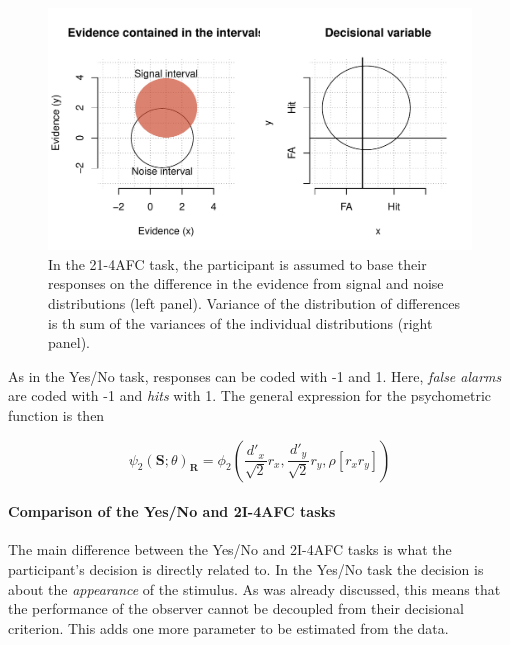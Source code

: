 \documentclass{article}\usepackage{knitr}
\begin{document}
\begin{figure}
\centering
\begin{knitrout}
\color{fgcolor}
\includegraphics[width=\maxwidth]{figure/unnamed-chunk-9-1} 

\end{knitrout}
\caption{In the 21-4AFC task, the participant is assumed to base their responses on the difference in the evidence from signal and noise distributions (left panel). Variance of the distribution of differences is th sum of the variances of the individual distributions (right panel).}
\label{fig:2I4AFC}
\end{figure}

As in the Yes/No task, responses can be coded with -1 and 1. Here, \textit{false alarms} are coded with -1 and \textit{hits} with 1.  The general expression for the psychometric function is then

\begin{equation}
\psi_2(\bm{S}; \theta)_{\bm{R}} = \phi_2(\frac{d'_x}{\sqrt{2}}r_x, \frac{d'_y}{\sqrt{2}} r_y, \rho [r_x r_y])
\label{eq:generalPfun2}
\end{equation}

\paragraph{Comparison of the Yes/No and 2I-4AFC tasks}

The main difference between the Yes/No and 2I-4AFC tasks is what the participant's decision is directly related to. In the Yes/No task the decision is about the \textit{appearance} of the stimulus. As was already discussed, this means that the performance of the observer cannot be decoupled from their decisional criterion. This adds one more parameter to be estimated from the data. 
\end{document}
